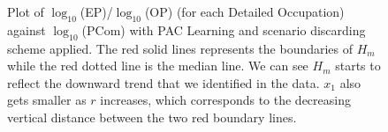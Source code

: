 \documentclass[11pt]{article}
\begin{document}
\begin{figure}[!htb]
    \ContinuedFloat
	\hfill	
	\hfill
	\caption{Plot of $\log_{10}$(EP)/$\log_{10}$(OP) (for each Detailed Occupation) against $\log_{10}$(PCom) with PAC Learning and scenario discarding scheme applied. The red solid lines represents the boundaries of $H_{m}$ while the red dotted line is the median line. We can see $H_{m}$ starts to reflect the downward trend that we identified in the data. $x_{1}$ also gets smaller as $r$ increases, which corresponds to the decreasing vertical distance between the two red boundary lines.}
	\label{fig:pac2}
\end{figure}
\end{document}
